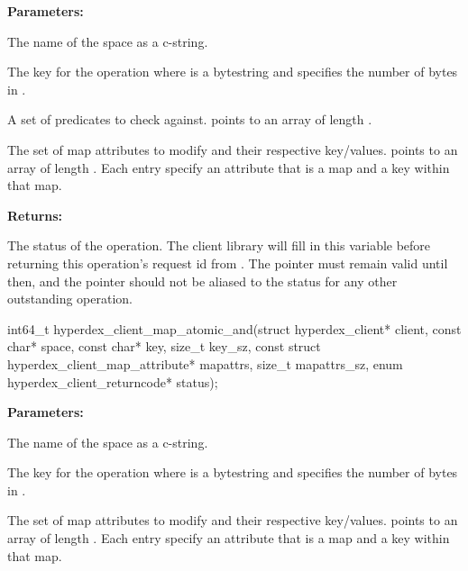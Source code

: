\noindent\textbf{Parameters:}
\begin{description}[labelindent=\widthof{{\code{mapattrs}, \code{mapattrs\_sz}}},leftmargin=*,noitemsep,nolistsep,align=right]
\item[\code{space}] The name of the space as a c-string.
\item[\code{key}, \code{key\_sz}] The key for the operation where  is a bytestring and  specifies the number of bytes in .
\item[\code{checks}, \code{checks\_sz}] A set of predicates to check against.   points to an array of length .
\item[\code{mapattrs}, \code{mapattrs\_sz}] The set of map attributes to modify and their respective key/values.   points to an array of length .  Each entry specify an attribute that is a map and a key within that map.
\end{description}

\noindent\textbf{Returns:}
\begin{description}[labelindent=\widthof{{\code{status}}},leftmargin=*,noitemsep,nolistsep,align=right]
\item[\code{status}] The status of the operation.  The client library will fill in this variable before returning this operation's request id from .  The pointer must remain valid until then, and the pointer should not be aliased to the status for any other outstanding operation.
\end{description}

\funcsep
{}
\begin{ccode}
int64_t hyperdex_client_map_atomic_and(struct hyperdex_client* client,
                const char* space,
                const char* key, size_t key_sz,
                const struct hyperdex_client_map_attribute* mapattrs, size_t mapattrs_sz,
                enum hyperdex_client_returncode* status);
\end{ccode}
\funcdesc 

\noindent\textbf{Parameters:}
\begin{description}[labelindent=\widthof{{\code{mapattrs}, \code{mapattrs\_sz}}},leftmargin=*,noitemsep,nolistsep,align=right]
\item[\code{space}] The name of the space as a c-string.
\item[\code{key}, \code{key\_sz}] The key for the operation where  is a bytestring and  specifies the number of bytes in .
\item[\code{mapattrs}, \code{mapattrs\_sz}] The set of map attributes to modify and their respective key/values.   points to an array of length .  Each entry specify an attribute that is a map and a key within that map.
\end{description}

